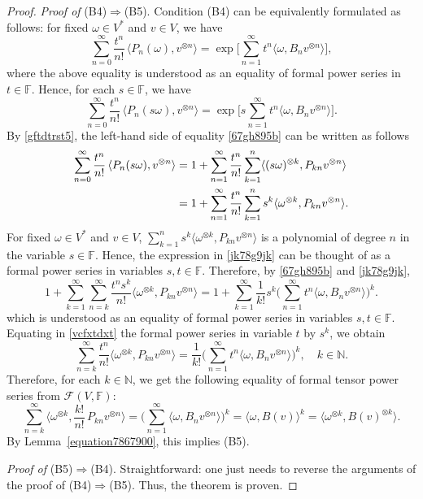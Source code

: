 \documentclass[12pt]{article}
\theoremstyle{remark}
\theoremstyle{remark}
\theoremstyle{remark}
\begin{document}
\begin{proof}
{\it Proof of\/} (B4)$\Rightarrow$(B5). Condition (B4) can be equivalently formulated as follows: for fixed $\omega \in V^*$ and $v\in V$, we have
\begin{equation*}
\sum_{n=0}^\infty \frac {t^n}{n!}\,\langle P_n(\omega),v^{\otimes n}\rangle=\exp \bigg[\sum_{n=1}^\infty t^n\langle \omega,B_n v^{\otimes n}\rangle \bigg],\label{67gh76}\end{equation*}
where the above equality is understood as an equality of formal power series in $t \in \mathbb F$. Hence, for each $s\in \mathbb F$, we have 
\begin{equation}\label{67gh895b}
\sum_{n=0}^\infty \frac {t^n}{n!}\,\langle P_n(s\omega),v^{\otimes n}\rangle=\exp \bigg[s\sum_{n=1}^\infty t^n\langle \omega,B_n v^{\otimes n}\rangle \bigg].
\end{equation}
By \eqref{gftdtrst5}, the left-hand side of equality \eqref{67gh895b} can be written as follows
\begin{align}
\sum_{n=0}^\infty \frac {t^n}{n!}\,\langle P_n(s\omega),v^{\otimes n}\rangle&=1+\sum_{n=1}^\infty \frac{t^n}{n!} \sum_{k=1}^n\langle (s\omega)^{\otimes k},P_{kn} v^{\otimes n}\rangle \notag\\
&=1+\sum_{n=1}^\infty \frac{t^n}{n!} \sum_{k=1}^ns^k\langle \omega^{\otimes k},P_{kn} v^{\otimes n}\rangle.\label{jk78g9jk}\end{align}
For fixed $\omega \in V^*$ and $v\in V$, $\sum_{k=1}^n s^k\langle \omega^{\otimes k}, P_{kn}v^{\otimes n}\rangle$
is a polynomial of degree $n$ in the variable $s\in \mathbb F$. Hence, the expression in \eqref{jk78g9jk} can be thought of as a formal power series in variables $s,t\in \mathbb F$. Therefore, by \eqref{67gh895b} and \eqref{jk78g9jk}, 
\begin{equation}1+\sum_{k=1}^\infty \sum_{n=k}^\infty\frac{t^ns^k}{n!}\langle \omega^{\otimes k},P_{kn} v^{\otimes n}\rangle= 1+\sum_{k=1}^\infty\frac1{k!}s^k\bigg(\sum_{n=1}^\infty t^n\langle \omega, B_nv^{\otimes n}\rangle \bigg)^k.
\label{vcfxtdxt}\end{equation}
which is understood as an equality of formal power series in variables $s,t\in \mathbb F$. Equating in \eqref{vcfxtdxt} the formal power series in variable $t$ by $s^k$, we obtain 
$$\sum_{n=k}^\infty \frac{t^n}{n!}\langle \omega^{\otimes k},P_{kn} v^{\otimes n}\rangle=\frac1{k!}\bigg(\sum_{n=1}^\infty t^n\langle \omega, B_nv^{\otimes n}\rangle \bigg)^k,\quad k\in\mathbb N.$$
Therefore, for each $k\in\mathbb N$, we get the following equality of formal tensor power series from $\mathcal F(V,\mathbb F)$:
\begin{equation*}\sum_{n=k}^\infty\langle \omega^{\otimes k},\frac {k!}{n!}\,P_{kn}v^{\otimes n}\rangle = \bigg(\sum_{n=1}^\infty\langle \omega,B_nv^{\otimes n} \rangle\bigg)^k=\langle \omega, B(v)\rangle^k=\langle\omega^{\otimes k},B(v)^{\otimes k}\rangle. \end{equation*}
By Lemma~\ref{equation7867900}, this implies (B5).  
 
 {\it Proof of\/} (B5)$\Rightarrow$(B4). Straightforward: one just needs to reverse the arguments of the proof of (B4)$\Rightarrow$(B5). Thus, the theorem is proven.
\end{proof}
\end{document}
